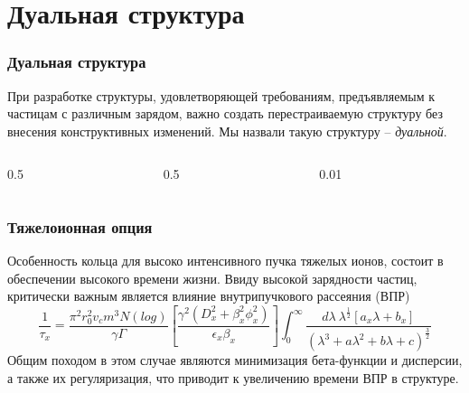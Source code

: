 \section{Дуальная структура} %
\begin{frame}
	\frametitle{Дуальная структура}
	При разработке структуры, удовлетворяющей требованиям, предъявляемым к частицам с различным зарядом, важно создать перестраиваемую структуру без внесения конструктивных изменений. Мы назвали такую структуру -- \textit{дуальной}.
	\vspace{2em} 
	\begin{columns}
		\begin{column}{0.5\textwidth}
			\raggedright
		\end{column}
		\hfill
		\begin{column}{0.5\textwidth}
			\raggedright
		\end{column}
		\begin{column}{0.01\textwidth}
		\end{column}
	\end{columns}		
\end{frame}
\begin{frame}
	\frametitle{Тяжелоионная опция}
	Особенность кольца для высоко интенсивного пучка тяжелых ионов, состоит в обеспечении высокого времени жизни. Ввиду высокой зарядности частиц, критически важным является влияние внутрипучкового рассеяния (ВПР)
	\begin{equation}
		\frac{1}{\tau_x}=\frac{\pi^2r_0^2v_cm^3N\left(log\right)}{\gamma\Gamma}\left[\frac{\gamma^2\left(D_x^2+\beta_x^2\phi_x^2\right)}{\epsilon_x\beta_x}\right]\int_{0}^{\infty}\frac{d\lambda\ \lambda^\frac{1}{2}\left[a_x\lambda+b_x\right]}{\left(\lambda^3+a\lambda^2+b\lambda+c\right)^\frac{3}{2}}
	\end{equation}
	Общим походом в этом случае являются минимизация бета-функции и дисперсии, а также их регуляризация, что приводит к увеличению времени ВПР в структуре.
\end{frame}
